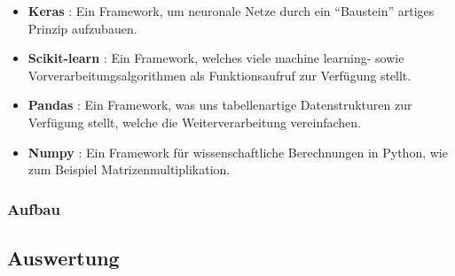 \begin{itemize}
    \item \textbf{Keras} \cite{chollet2015keras}: Ein Framework, um neuronale Netze durch ein ``Baustein'' artiges 
        Prinzip aufzubauen. 
    \item \textbf{Scikit-learn} \cite{scikit-learn}: Ein Framework, welches viele machine learning-
        sowie Vorverarbeitungsalgorithmen als Funktionsaufruf zur Verfügung stellt.
    \item \textbf{Pandas} \cite{mckinney-proc-scipy-2010}: Ein Framework, was uns 
        tabellenartige Datenstrukturen zur Verfügung stellt, welche die Weiterverarbeitung vereinfachen.
    \item \textbf{Numpy} \cite{numpy}: Ein Framework für wissenschaftliche Berechnungen 
        in Python, wie zum Beispiel Matrizenmultiplikation.  
\end{itemize}

\subsubsection{Aufbau} \label{Aufbau}



\subsection{Auswertung} \label{Auswertung}
